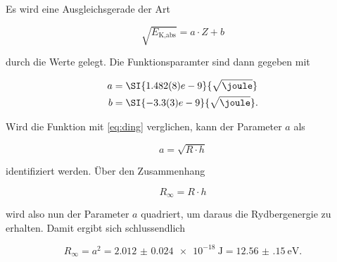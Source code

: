 Es wird eine Ausgleichsgerade der Art 

\begin{equation}
    \sqrt{E_\text{K,abs}} = a \cdot Z + b
\end{equation}

durch die Werte gelegt.
Die Funktionsparamter sind dann gegeben mit 

\begin{align*}
    a &= \SI{1.482(8)e-9}{\sqrt{\joule}}\\
    b &= \SI{-3.3(3)e-9}{\sqrt{\joule}}.
\end{align*}

Wird die Funktion mit \eqref{eq:ding} verglichen, kann der Parameter $a$ als 

\begin{equation}
    a = \sqrt{R \cdot h}
\end{equation}

identifiziert werden. 
Über den Zusammenhang 

\begin{equation}
    R_\infty = R \cdot h
\end{equation}

wird also nun der Parameter $a$ quadriert, um daraus die Rydbergenergie zu erhalten.
Damit ergibt sich schlussendlich

\begin{equation}
    R_\infty = a^2 = \SI{2.012(24)e-18}{\joule} = \SI{12.56(15)}{\electronvolt}.
\end{equation}

